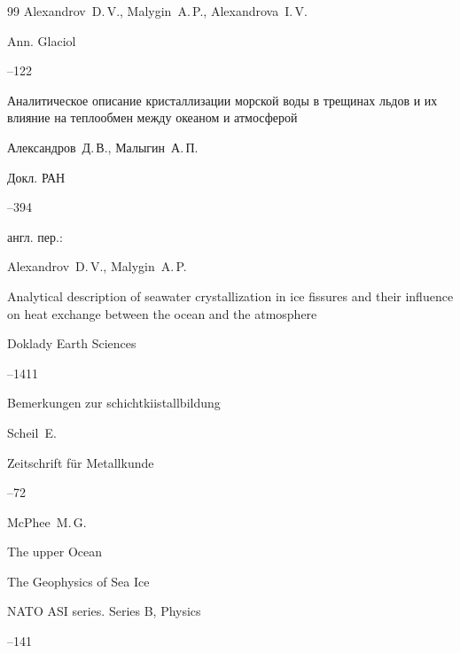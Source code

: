\begin{thebibliography}{99}
\by Alexandrov~D.\,V., Malygin~A.\,P., Alexandrova~I.\,V.

\jour Ann. Glaciol




--122






\paper Аналитическое описание кристаллизации морской воды в трещинах льдов и их влияние на теплообмен между океаном и атмосферой

\by Александров~Д.\,В., Малыгин~А.\,П.

\jour Докл. РАН




--394

\transl англ. пер.:~

\by Alexandrov~D.\,V., Malygin~A.\,P.

\paper Analytical description of seawater crystallization in ice fissures and their influence on heat exchange between the ocean and the atmosphere

\jour Doklady Earth Sciences




–1411




\paper 	Bemerkungen zur schichtkiistallbildung

\by Scheil~E.

\jour Zeitschrift f\"ur Metallkunde



--72




\by McPhee~M.\,G.

\paper The upper Ocean

\inbook The Geophysics of Sea Ice

\serial NATO ASI series. Series B, Physics



--141


\end{thebibliography}
